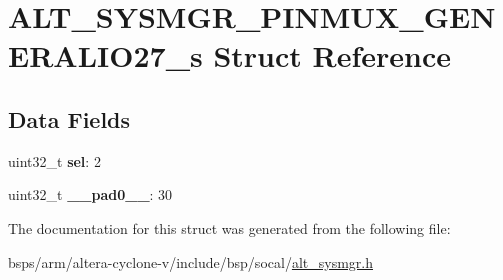 \hypertarget{structALT__SYSMGR__PINMUX__GENERALIO27__s}{}\section{A\+L\+T\+\_\+\+S\+Y\+S\+M\+G\+R\+\_\+\+P\+I\+N\+M\+U\+X\+\_\+\+G\+E\+N\+E\+R\+A\+L\+I\+O27\+\_\+s Struct Reference}
\label{structALT__SYSMGR__PINMUX__GENERALIO27__s}
\subsection*{Data Fields}
\begin{DoxyCompactItemize}
\item 
\mbox{\label{structALT__SYSMGR__PINMUX__GENERALIO27__s_af2da2f05adde55179ab83728be17e739}} 
uint32\+\_\+t {\bfseries sel}\+: 2
\item 
\mbox{\label{structALT__SYSMGR__PINMUX__GENERALIO27__s_a4460ef906860dcd04f5a7593c0c35e33}} 
uint32\+\_\+t {\bfseries \+\_\+\+\_\+pad0\+\_\+\+\_\+}\+: 30
\end{DoxyCompactItemize}


The documentation for this struct was generated from the following file\+:\begin{DoxyCompactItemize}
\item 
bsps/arm/altera-\/cyclone-\/v/include/bsp/socal/\mbox{\hyperlink{alt__sysmgr_8h}{alt\+\_\+sysmgr.\+h}}\end{DoxyCompactItemize}
